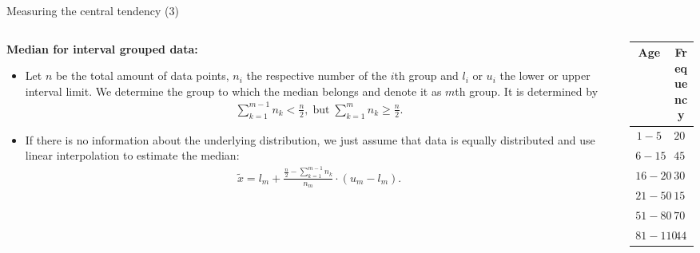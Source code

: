 \documentclass[aspectratio=169,t]{beamer}
\begin{document}
  { 
    \begin{frame}{Measuring the central tendency (3)}
      \begin{columns}
        \begin{column}{0.6\textwidth}
          \textbf{Median for interval grouped data:}
          \begin{itemize}[noitemsep]
            \item Let $n$ be the total amount of data points, $n_i$ the respective number of the $i$th group and $l_i$ or $u_i$ the lower or upper interval limit. We determine the group to which the median belongs and denote it as $m$th group. It is determined by
            \begin{align}
              \sum_{k=1}^{m-1}n_k < \frac{n}{2}, \; \text{but} \; \sum_{k=1}^{m} n_k \geq \frac{n}{2}.
            \end{align}
            \item If there is no information about the underlying distribution, we just assume that data is equally distributed and use linear interpolation to estimate the median:
            \begin{align}
              \tilde{x} = l_m + \frac{\frac{n}{2}-\sum_{k=1}^{m-1}n_k}{n_m} \cdot (u_m-l_m).
            \end{align}
          \end{itemize}
        \end{column}
        \begin{column}{0.3\textwidth}  %
        \begin{table}
        \begin{tabular}{|c|c|}
          Age & Frequency \\ \hline
          $1-5$ & $200$ \\
          $6-15$ & $450$ \\
          $16-20$ & $300$ \\
          $21-50$ & $1500$ \\
          $51-80$ & $700$ \\
          $81-110$ & $44$
        \end{tabular}\\[0.5cm]
        \end{table}
        \end{column}
      \end{columns}
    \end{frame}
  }
\end{document}
